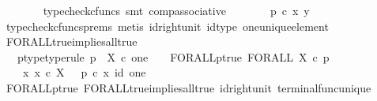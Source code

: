 \begin{isabellebody}
\ \ \ \ \ \ \isamarkupfalse%
\ {\isacharparenleft}{\kern0pt}typecheck{\isacharunderscore}{\kern0pt}cfuncs{\isacharcomma}{\kern0pt}\ smt\ comp{\isacharunderscore}{\kern0pt}associative{}{\isacharparenright}{\kern0pt}\isanewline
\ \ \ \ \isamarkupfalse%
\ \isamarkupfalse%
\ {\isachardoublequoteopen}p\ {\isasymcirc}\isactrlsub c\ {\isasymlangle}x{\isacharcomma}{\kern0pt}\ y{\isasymrangle}\ {\isacharequal}{\kern0pt}\ {\isasymt}{\isachardoublequoteclose}\isanewline
\ \ \ \ \ \ \isamarkupfalse%
\ {\isacharparenleft}{\kern0pt}typecheck{\isacharunderscore}{\kern0pt}cfuncs{\isacharunderscore}{\kern0pt}prems{\isacharcomma}{\kern0pt}\ metis\ id{\isacharunderscore}{\kern0pt}right{\isacharunderscore}{\kern0pt}unit{}\ id{\isacharunderscore}{\kern0pt}type\ one{\isacharunderscore}{\kern0pt}unique{\isacharunderscore}{\kern0pt}element{\isacharparenright}{\kern0pt}\isanewline
\ \ \isamarkupfalse%
\isanewline
{}\isamarkupfalse%
%
\endisatagproof
{\isafoldproof}%
%
\isadelimproof
\isanewline
%
\endisadelimproof
\isanewline
{}\isamarkupfalse%
\ FORALL{\isacharunderscore}{\kern0pt}true{\isacharunderscore}{\kern0pt}implies{\isacharunderscore}{\kern0pt}all{\isacharunderscore}{\kern0pt}true{}{\isacharcolon}{\kern0pt}\isanewline
\ \ \ p{\isacharunderscore}{\kern0pt}type{\isacharbrackleft}{\kern0pt}type{\isacharunderscore}{\kern0pt}rule{\isacharbrackright}{\kern0pt}{\isacharcolon}{\kern0pt}\ {\isachardoublequoteopen}p\ {\isacharcolon}{\kern0pt}\ X\ {\isasymtimes}\isactrlsub c\ one\ {\isasymrightarrow}\ {\isasymOmega}{\isachardoublequoteclose}\ \ FORALL{\isacharunderscore}{\kern0pt}p{\isacharunderscore}{\kern0pt}true{\isacharcolon}{\kern0pt}\ {\isachardoublequoteopen}FORALL\ X\ {\isasymcirc}\isactrlsub c\ p\isactrlsup {\isasymsharp}\ {\isacharequal}{\kern0pt}\ {\isasymt}{\isachardoublequoteclose}\isanewline
\ \ \ {\isachardoublequoteopen}{\isasymAnd}\ x{\isachardot}{\kern0pt}\ x\ {\isasymin}\isactrlsub c\ X\ \ {\isasymLongrightarrow}\ p\ {\isasymcirc}\isactrlsub c\ {\isasymlangle}x{\isacharcomma}{\kern0pt}\ id\ one{\isasymrangle}\ {\isacharequal}{\kern0pt}\ {\isasymt}{\isachardoublequoteclose}\isanewline
%
\isadelimproof
\ \ %
\endisadelimproof
%
\isatagproof
{}\isamarkupfalse%
\ FORALL{\isacharunderscore}{\kern0pt}p{\isacharunderscore}{\kern0pt}true\ FORALL{\isacharunderscore}{\kern0pt}true{\isacharunderscore}{\kern0pt}implies{\isacharunderscore}{\kern0pt}all{\isacharunderscore}{\kern0pt}true{}\ id{\isacharunderscore}{\kern0pt}right{\isacharunderscore}{\kern0pt}unit{}\ terminal{\isacharunderscore}{\kern0pt}func{\isacharunderscore}{\kern0pt}unique\ \isamarkupfalse%

\end{isabellebody}
